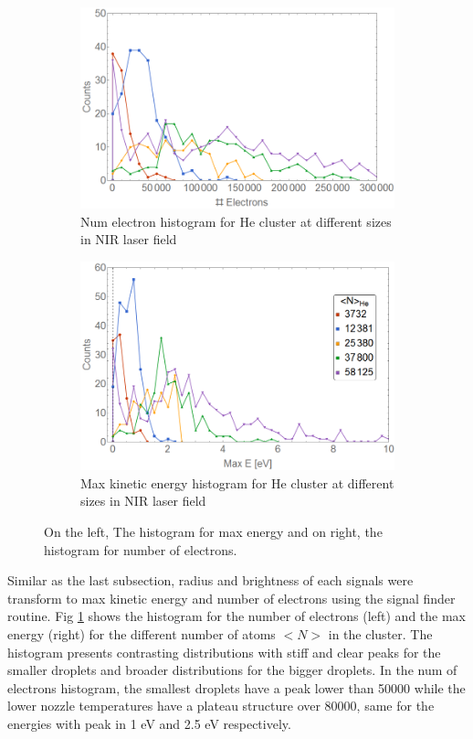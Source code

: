 \begin{figure}[h!]
\centering
\begin{subfigure}[l]{0.49\textwidth}\caption{Num electron histogram for He cluster at different sizes in NIR laser field}
\includegraphics[width=1\textwidth]{../Images/results/NI_He_Dropletsize/HElectrones.png}   				\end{subfigure}
\begin{subfigure}[l]{0.49\textwidth}\caption{Max kinetic energy histogram for He cluster at different sizes in NIR laser field}
\includegraphics[width=1\textwidth]{../Images/results/NI_He_Dropletsize/HEnerg2.png} 
\end{subfigure}
\caption[NIR He droplet size. histograms]{On the left, The histogram for max energy and on right, the histogram for number of electrons.}
\label{fig:NIRHehistosize}
\end{figure}

Similar as the last subsection, radius and brightness of each signals were transform to max kinetic energy and number of electrons using the signal finder routine. Fig \ref{fig:NIRHehistosize} shows the histogram for the number of electrons (left) and the max energy (right) for the different number of atoms $<N>$ in the cluster. The histogram presents contrasting distributions with stiff and clear peaks for the smaller droplets and broader distributions for the bigger droplets. In the num of electrons histogram, the smallest droplets have a peak lower than 50000 while the lower nozzle temperatures have a plateau structure over 80000, same for the energies with peak in 1 eV and 2.5 eV respectively.

